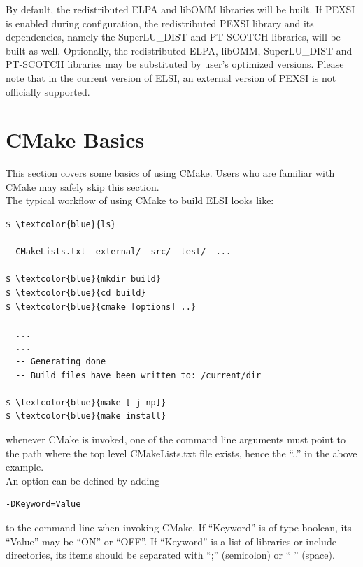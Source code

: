 \documentclass{report}
\begin{document}
By default, the redistributed ELPA and libOMM libraries will be built.  If PEXSI is enabled during configuration, the redistributed PEXSI library and its dependencies, namely the SuperLU\_DIST and PT-SCOTCH libraries, will be built as well.  Optionally, the redistributed ELPA, libOMM, SuperLU\_DIST and PT-SCOTCH libraries may be substituted by user's optimized versions.  Please note that in the current version of ELSI, an external version of PEXSI is not officially supported.\\

\section{CMake Basics}
\label{sec:cmake}
This section covers some basics of using CMake.  Users who are familiar with CMake may safely skip this section.\\

The typical workflow of using CMake to build ELSI looks like:\\

\begin{Verbatim}[commandchars=\\\{\}]
$ \textcolor{blue}{ls}

  CMakeLists.txt  external/  src/  test/  ...

$ \textcolor{blue}{mkdir build}
$ \textcolor{blue}{cd build}
$ \textcolor{blue}{cmake [options] ..}

  ...
  ...
  -- Generating done
  -- Build files have been written to: /current/dir

$ \textcolor{blue}{make [-j np]}
$ \textcolor{blue}{make install}
\end{Verbatim}

whenever CMake is invoked, one of the command line arguments must point to the path where the top level CMakeLists.txt file exists, hence the ``..'' in the above example.\\

An option can be defined by adding\\

\begin{verbatim}
-DKeyword=Value
\end{verbatim}

to the command line when invoking CMake.  If ``Keyword'' is of type boolean, its ``Value'' may be ``ON'' or ``OFF''.  If ``Keyword'' is a list of libraries or include directories, its items should be separated with ``;'' (semicolon) or `` '' (space).\\
\end{document}

